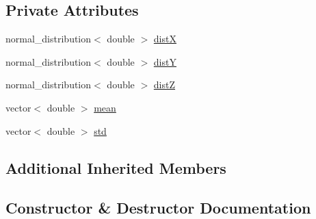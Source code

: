 \subsection*{Private Attributes}
\begin{DoxyCompactItemize}
\item 
normal\+\_\+distribution$<$ double $>$ \hyperlink{class_normal_distribution_generator_aec239e19cb64a14f812b4d70bb1d3c38}{distX}
\item 
normal\+\_\+distribution$<$ double $>$ \hyperlink{class_normal_distribution_generator_aeb225a80caf342a1cf198a8550fecd7c}{distY}
\item 
normal\+\_\+distribution$<$ double $>$ \hyperlink{class_normal_distribution_generator_a266178f74bb9983818a05edec742717e}{distZ}
\item 
vector$<$ double $>$ \hyperlink{class_normal_distribution_generator_a64b8ae4a574846641023d954e3143ce9}{mean}
\item 
vector$<$ double $>$ \hyperlink{class_normal_distribution_generator_ab41e9da41497d0f6491064f4b27f5123}{std}
\end{DoxyCompactItemize}
\subsection*{Additional Inherited Members}


\subsection{Constructor \& Destructor Documentation}
